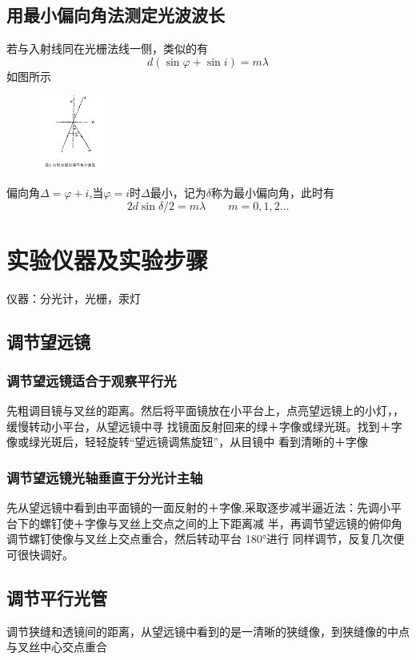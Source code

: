 \documentclass{ctexart}
\begin{document}
  \subsection{用最小偏向角法测定光波波长}
  若与入射线同在光栅法线一侧，类似的有
  \begin{equation}\label{eq:diffraction2}
    d (\sin{\varphi} + \sin{i}) = m\lambda 
  \end{equation}
  如图所示
  \begin{figure}[htbp]
    \centering
    \includegraphics[width=0.2\textwidth,height=0.25\textwidth]{图片2.png}
    \end{figure} 
  偏向角$\Delta =\varphi + i$,当$\varphi=i$时$\Delta$最小，记为$\delta $称为最小偏向角，此时有
  \begin{equation}\label{eq:diffraction2}
    2d \sin{\delta / 2} = m\lambda \qquad  m=0,1,2…
  \end{equation}
\section{实验仪器及实验步骤}
  仪器：分光计，光栅，汞灯
  \subsection{调节望远镜}
    \subsubsection{调节望远镜适合于观察平行光}
      先粗调目镜与叉丝的距离。然后将平面镜放在小平台上，点亮望远镜上的小灯，，缓慢转动小平台，从望远镜中寻
      找镜面反射回来的绿＋字像或绿光斑。找到＋字像或绿光斑后，轻轻旋转“望远镜调焦旋钮”，从目镜中
      看到清晰的＋字像
    \subsubsection{调节望远镜光轴垂直于分光计主轴}
    先从望远镜中看到由平面镜的一面反射的＋字像,采取逐步减半逼近法：先调小平台下的螺钉使＋字像与叉丝上交点之间的上下距离减
    半，再调节望远镜的俯仰角调节螺钉使像与叉丝上交点重合，然后转动平台 180°进行
    同样调节，反复几次便可很快调好。
    \subsection{调节平行光管}
    调节狭缝和透镜间的距离，从望远镜中看到的是一清晰的狭缝像，到狭缝像的中点与叉丝中心交点重合
\end{document}

